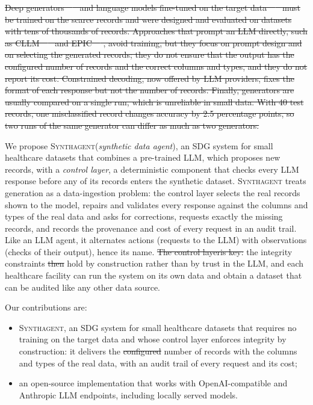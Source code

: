 \documentclass[conference]{IEEEtran}
\newcommand{\system}{\textsc{Synthagent}\xspace}
\providecommand{\DIFaddtex}[1]{{\protect\color{blue}\uwave{#1}}} %
\providecommand{\DIFdeltex}[1]{{\protect\color{red}\sout{#1}}}                      %
\providecommand{\DIFaddbegin}{} %
\providecommand{\DIFaddend}{} %
\providecommand{\DIFdelbegin}{} %
\providecommand{\DIFdelend}{} %
\providecommand{\DIFadd}[1]{\texorpdfstring{\DIFaddtex{#1}}{#1}} %
\providecommand{\DIFdel}[1]{\texorpdfstring{\DIFdeltex{#1}}{}} %
\newcommand{\DIFscaledelfig}{0.5}
\newlength{\DIFdelgraphicswidth} %
\newlength{\DIFdelgraphicsheight} %
\newcommand{\DIFaddincludegraphics}[2][]{{\color{blue}\fbox{\DIFOincludegraphics[#1]{#2}}}} %
\newcommand{\DIFdelincludegraphics}[2][]{%
\sbox{\DIFdelgraphicsbox}{\DIFOincludegraphics[#1]{#2}}%
\settoboxwidth{\DIFdelgraphicswidth}{\DIFdelgraphicsbox} %
\settoboxtotalheight{\DIFdelgraphicsheight}{\DIFdelgraphicsbox} %
\scalebox{\DIFscaledelfig}{%
\parbox[b]{\DIFdelgraphicswidth}{\usebox{\DIFdelgraphicsbox}\\[-\baselineskip] \rule{\DIFdelgraphicswidth}{0em}}\llap{\resizebox{\DIFdelgraphicswidth}{\DIFdelgraphicsheight}{%
\setlength{\unitlength}{\DIFdelgraphicswidth}%
\begin{picture}(1,1)%
\thicklines\linethickness{2pt} %
{\color[rgb]{1,0,0}\put(0,0){\framebox(1,1){}}}%
{\color[rgb]{1,0,0}\put(0,0){\line( 1,1){1}}}%
{\color[rgb]{1,0,0}\put(0,1){\line(1,-1){1}}}%
\end{picture}%
}\hspace*{3pt}}} %
} %
\DeclareRobustCommand{\DIFaddbegin}{\DIFOaddbegin \let\includegraphics\DIFaddincludegraphics} %
\DeclareRobustCommand{\DIFaddend}{\DIFOaddend \let\includegraphics\DIFOincludegraphics} %
\DeclareRobustCommand{\DIFdelbegin}{\DIFOdelbegin \let\includegraphics\DIFdelincludegraphics} %
\DeclareRobustCommand{\DIFdelend}{\DIFOaddend \let\includegraphics\DIFOincludegraphics} %
\begin{document}
\DIFdelbegin \DIFdel{Deep generators~\mbox{%
\cite{xu2019ctgan,kotelnikov2023tabddpm,zhang2024tabsyn} }\hskip0pt%
and language models fine-tuned on the target data~\mbox{%
\cite{borisov2023great,solatorio2023realtabformer} }\hskip0pt%
must be trained on the scarce records and were designed and evaluated on datasets with tens of thousands of records. Approaches that prompt an LLM directly, such as CLLM~\mbox{%
\cite{seedat2024cllm} }\hskip0pt%
and EPIC~\mbox{%
\cite{kim2024epic}}\hskip0pt%
, avoid training, but they focus on prompt design and on selecting the generated records; they do not ensure that the output has the configured number of records and the correct columns and types, and they do not report its cost. Constrained decoding, now offered by LLM providers, fixes the format of each response but not the number of records. Finally, generators are usually compared on a single run, which is unreliable in small data. With 40 test records, one misclassified record changes accuracy by 2.5 percentage points, so two runs of the same generator can differ as much as two generators.
}%

\DIFdelend We propose \system (\emph{synthetic data agent}), an SDG system for small healthcare datasets that combines a pre-trained LLM, which proposes new records, with a \emph{control layer}, a deterministic component that checks every LLM response before any of its records enters the synthetic dataset. \system treats generation as a data-ingestion problem: the control layer selects the real records shown to the model, repairs and validates every response against the columns and types of the real data and asks for corrections, requests exactly the missing records, and records the provenance and cost of every request in an audit trail. Like an LLM agent, it alternates actions (requests to the LLM) with observations (checks of their output), hence its name. \DIFdelbegin \DIFdel{The control layeris key: }\DIFdelend \DIFaddbegin \DIFadd{With the control layer, }\DIFaddend the integrity constraints \DIFdelbegin \DIFdel{then }\DIFdelend hold by construction rather than by trust in the LLM, and each healthcare facility can run the system on its own data and obtain a dataset that can be audited like any other data source.

Our contributions are:
\begin{itemize}[leftmargin=*,itemsep=1pt]
  \item \system, an SDG system for small healthcare datasets that requires no training on the target data and whose control layer enforces integrity by construction: it delivers the \DIFdelbegin \DIFdel{configured }\DIFdelend \DIFaddbegin \DIFadd{requested }\DIFaddend number of records with the columns and types of the real data, with an audit trail of every request and its cost;
  \item an open-source implementation that works with OpenAI-compatible and Anthropic LLM endpoints, including locally served models.
\end{itemize}
\end{document}
